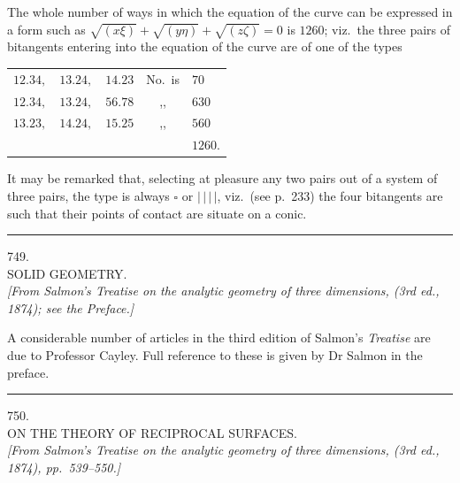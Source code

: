 \documentclass[11pt]{article}
\begin{document}
\medskip
\noindent
The whole number of ways in which the equation of the curve can be expressed
in a form such as $\sqrt{(x\xi)} + \sqrt{(y\eta)} + \sqrt{(z\zeta)} = 0$ is
$1260$; viz.\ the three pairs of bitangents entering into the equation of
the curve are of one of the types
\begin{center}
\begin{tabular}{lll cl}
$12 . 34,$ & $13 . 24,$ & $14 . 23$ & \quad No.\ is & $70$\\
$12 . 34,$ & $13 . 24,$ & $56 . 78$ & ,, & $630$\\
$13 . 23,$ & $14 . 24,$ & $15 . 25$ & ,, & $560$\\
\hline
& & & & $1260.$\\
\end{tabular}
\end{center}

It may be remarked that, selecting at pleasure any two pairs out of a system
of three pairs, the type is always $\square$ or $|\,|\,|\,|$, viz.\ (see
p.\ 233) the four bitangents are such that their points of contact are
situate on a conic.

\bigskip
\bigskip
\hrule
\bigskip

\begin{center}
\textsc{749.}\\[6pt]
\textsc{SOLID GEOMETRY.}\\[6pt]
\textit{[From Salmon's \emph{Treatise on the analytic geometry of three
dimensions}, (3rd ed., 1874); see the Preface.]}
\end{center}

\medskip
\noindent
A considerable number of articles in the third edition of Salmon's
\emph{Treatise} are due to Professor Cayley. Full reference to these is
given by Dr Salmon in the preface.

\bigskip
\bigskip
\hrule
\bigskip

\begin{center}
\textsc{750.}\\[6pt]
\textsc{ON THE THEORY OF RECIPROCAL SURFACES.}\\[6pt]
\textit{[From Salmon's \emph{Treatise on the analytic geometry of three
dimensions}, (3rd ed., 1874), pp.\ 539--550.]}
\end{center}
\end{document}
